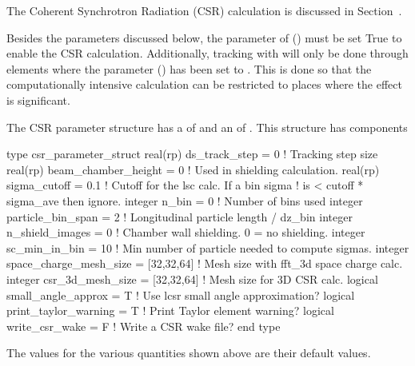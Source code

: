 {The Coherent Synchrotron Radiation (CSR) calculation is discussed in Section~.

Besides the parameters discussed below, the  parameter of 
() must be set True to enable the CSR calculation. Additionally, tracking with
 will only be done through elements where the parameter  () has
been set to . This is done so that the computationally intensive  calculation can
be restricted to places where the  effect is significant.

The CSR parameter structure has a  of  and an  of .  This structure has components
\begin{example}
  type csr_parameter_struct 
    real(rp) ds_track_step = 0                  ! Tracking step size
    real(rp) beam_chamber_height = 0            ! Used in shielding calculation.
    real(rp) sigma_cutoff = 0.1                 ! Cutoff for the lsc calc. If a bin sigma
                                                !  is < cutoff * sigma_ave then ignore.
    integer n_bin = 0                           ! Number of bins used
    integer particle_bin_span = 2               ! Longitudinal particle length / dz_bin
    integer n_shield_images = 0                 ! Chamber wall shielding. 0 = no shielding.
    integer sc_min_in_bin = 10                  ! Min number of particle needed to compute sigmas.
    integer space_charge_mesh_size = [32,32,64] ! Mesh size with fft_3d space charge calc.
    integer csr_3d_mesh_size = [32,32,64]       ! Mesh size for 3D CSR calc.
    logical small_angle_approx = T              ! Use lcsr small angle approximation?
    logical print_taylor_warning = T            ! Print Taylor element warning?
    logical write_csr_wake = F                  ! Write a CSR wake file?
  end type
\end{example}
The values for the various quantities shown above are their default values. 

}
